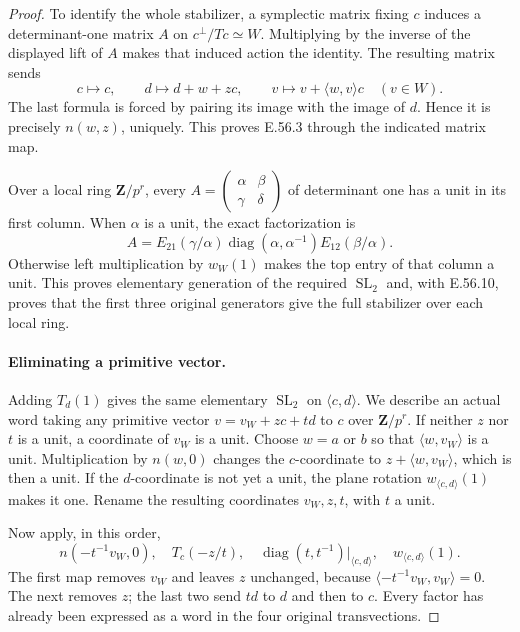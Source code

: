 \begin{proof}
To identify the whole stabilizer, a symplectic matrix
fixing $c$ induces a determinant-one matrix $A$ on
$c^\perp/Tc\simeq W$. Multiplying by the inverse
of the displayed lift of $A$ makes that induced
action the identity. The resulting matrix sends
\[
 c\longmapsto c,\qquad
 d\longmapsto d+w+zc,\qquad
 v\longmapsto v+\langle w,v\rangle c\quad(v\in W).
 \tag{E.56.11}
\]
The last formula is forced by pairing its image
with the image of $d$. Hence it is precisely
$n(w,z)$, uniquely. This proves E.56.3 through
the indicated matrix map.

Over a local ring $\mathbf Z/p^r$, every
$A=\left(\begin{smallmatrix}\alpha&\beta\\\gamma&\delta\end{smallmatrix}\right)$
of determinant one has a unit in its first column.
When $\alpha$ is a unit, the exact factorization is
\[
 A=E_{21}(\gamma/\alpha)
          \operatorname{diag}(\alpha,\alpha^{-1})
                                      E_{12}(\beta/\alpha).
 \tag{E.56.12}
\]
Otherwise left multiplication by $w_W(1)$ makes
the top entry of that column a unit. This proves
elementary generation of the required
$\operatorname{SL}_2$ and, with E.56.10, proves
that the first three original generators give
the full stabilizer over each local ring.

\paragraph{Eliminating a primitive vector.}
Adding $T_d(1)$ gives the same elementary
$\operatorname{SL}_2$ on $\langle c,d\rangle$.
We describe an actual word taking any primitive
vector
$v=v_W+zc+td$ to $c$ over $\mathbf Z/p^r$.
If neither $z$ nor $t$ is a unit, a coordinate
of $v_W$ is a unit. Choose $w=a$ or $b$ so that
$\langle w,v_W\rangle$ is a unit. Multiplication
by $n(w,0)$ changes the $c$-coordinate to
$z+\langle w,v_W\rangle$, which is then a unit.
If the $d$-coordinate is not yet a unit, the
plane rotation $w_{\langle c,d\rangle}(1)$
makes it one. Rename the resulting coordinates
$v_W,z,t$, with $t$ a unit.

Now apply, in this order,
\[
 n(-t^{-1}v_W,0),\quad T_c(-z/t),\quad
 \operatorname{diag}(t,t^{-1})\big|_{\langle c,d\rangle},\quad
 w_{\langle c,d\rangle}(1).
 \tag{E.56.13}
\]
The first map removes $v_W$ and leaves $z$ unchanged,
because $\langle -t^{-1}v_W,v_W\rangle=0$.
The next removes $z$; the last two send $td$ to
$d$ and then to $c$. Every factor has already been
expressed as a word in the four original transvections.


\end{proof}
